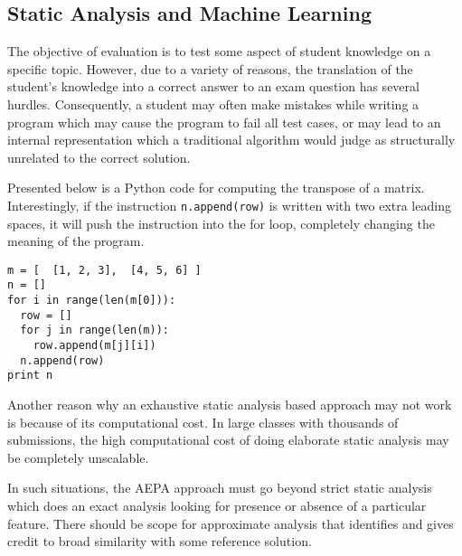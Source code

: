 \documentclass[12pt]{article}
\begin{document}
\subsection{Static Analysis and Machine Learning} \label{s:aepa2}
The objective of evaluation is to test some aspect of student knowledge on a specific topic. However, due to a variety of reasons, the translation of the student's knowledge into a correct answer to an exam question has several hurdles. Consequently, a student may often make mistakes while writing a program which may cause the program to fail all test cases, or may lead to an internal representation which a traditional algorithm would judge as structurally unrelated to the correct solution.

Presented below is a Python code for computing the transpose of a matrix. Interestingly, if the instruction \lstinline[style=pc]@n.append(row)@ is written with two extra leading spaces, it will push the instruction into the for loop, completely changing the meaning of the program.
\begin{lstlisting}[style=pc]
m = [  [1, 2, 3],  [4, 5, 6] ]
n = []
for i in range(len(m[0])):
  row = []
  for j in range(len(m)):
    row.append(m[j][i])
  n.append(row)
print n
\end{lstlisting}

Another reason why an exhaustive static analysis based approach may not work is because of its computational cost. In large classes with thousands of submissions, the high computational cost of doing elaborate static analysis may be completely unscalable.

In such situations, the AEPA approach must go beyond strict static analysis which does an exact analysis looking for presence or absence of a particular feature. There should be scope for approximate analysis that identifies and gives credit to broad similarity with some reference solution.
\end{document}
